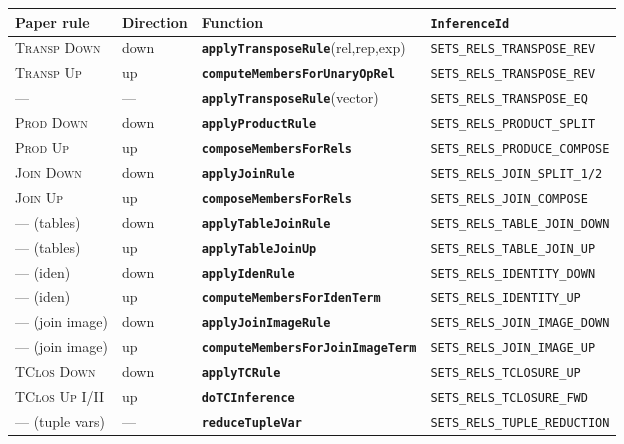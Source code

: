 \documentclass[11pt,a4paper]{article}
\newcommand{\code}[1]{\texttt{\small #1}}
\newcommand{\fn}[1]{\texttt{\small\bfseries #1}}
\theoremstyle{definition}
\begin{document}
\begin{center}\small
\renewcommand{\arraystretch}{1.15}
\begin{tabular}{@{}lllp{4.1cm}@{}}
\toprule
Paper rule & Direction & Function & \code{InferenceId}\\
\midrule
\textsc{Transp Down} & down & \fn{applyTransposeRule}(rel,rep,exp) & \code{SETS\_RELS\_TRANSPOSE\_REV}\\
\textsc{Transp Up}   & up   & \fn{computeMembersForUnaryOpRel}     & \code{SETS\_RELS\_TRANSPOSE\_REV}\\
---                  & ---  & \fn{applyTransposeRule}(vector)      & \code{SETS\_RELS\_TRANSPOSE\_EQ}\\
\textsc{Prod Down}   & down & \fn{applyProductRule}                & \code{SETS\_RELS\_PRODUCT\_SPLIT}\\
\textsc{Prod Up}     & up   & \fn{composeMembersForRels}           & \code{SETS\_RELS\_PRODUCE\_COMPOSE}\\
\textsc{Join Down}   & down & \fn{applyJoinRule}                   & \code{SETS\_RELS\_JOIN\_SPLIT\_1/2}\\
\textsc{Join Up}     & up   & \fn{composeMembersForRels}           & \code{SETS\_RELS\_JOIN\_COMPOSE}\\
--- (tables)         & down & \fn{applyTableJoinRule}              & \code{SETS\_RELS\_TABLE\_JOIN\_DOWN}\\
--- (tables)         & up   & \fn{applyTableJoinUp}                & \code{SETS\_RELS\_TABLE\_JOIN\_UP}\\
--- (iden)           & down & \fn{applyIdenRule}                   & \code{SETS\_RELS\_IDENTITY\_DOWN}\\
--- (iden)           & up   & \fn{computeMembersForIdenTerm}       & \code{SETS\_RELS\_IDENTITY\_UP}\\
--- (join image)     & down & \fn{applyJoinImageRule}              & \code{SETS\_RELS\_JOIN\_IMAGE\_DOWN}\\
--- (join image)     & up   & \fn{computeMembersForJoinImageTerm}  & \code{SETS\_RELS\_JOIN\_IMAGE\_UP}\\
\textsc{TClos Down}  & down & \fn{applyTCRule}                     & \code{SETS\_RELS\_TCLOSURE\_UP}\\
\textsc{TClos Up I/II} & up & \fn{doTCInference}                   & \code{SETS\_RELS\_TCLOSURE\_FWD}\\
--- (tuple vars)     & ---  & \fn{reduceTupleVar}                  & \code{SETS\_RELS\_TUPLE\_REDUCTION}\\
\bottomrule
\end{tabular}
\end{center}
\end{document}
